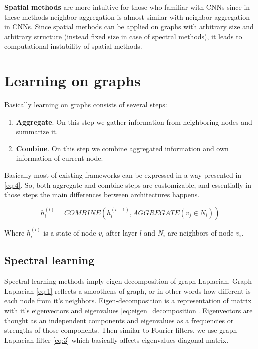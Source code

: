 \textbf{Spatial methods} are more intuitive for those who familiar with CNNs since in these methods neighbor aggregation is almost similar with neighbor aggregation in CNNs. Since spatial methods can be applied on graphs with arbitrary size and arbitrary structure (instead fixed size in case of spectral methods), it leads to computational instability of spatial methods.

\chapter{Learning on graphs}

Basically learning on graphs consists of several steps:

\begin{enumerate}
    \item \textbf{Aggregate}. On this step we gather information from neighboring nodes and summarize it.
    \item \textbf{Combine}. On this step we combine aggregated information and own information of current node.
\end{enumerate}

Basically most of existing frameworks can be expressed in a way presented in \ref{eq:4}. So, both aggregate and combine steps are customizable, and essentially in those steps the main differences between architectures happens.

\begin{equation}
    \label{eq:4}
    h_i^{(l)}=COMBINE(h_i^{(l-1)}, AGGREGATE(v_j\in N_i))
\end{equation}

Where $h_i^{(l)}$ is a state of node $v_i$ after layer $l$ and $N_i$ are neighbors of node $v_i$.

\section{Spectral learning}

Spectral learning methods imply eigen-decomposition of graph Laplacian. Graph Laplacian \ref{eq:1} reflects a smoothens of graph, or in other words how different is each node from it's neighbors. Eigen-decomposition is a representation of matrix with it's eigenvectors and eigenvalues \ref{eq:eigen_decomposition}. Eigenvectors are thought as an independent components and eigenvalues as a frequencies or strengths of those components. Then similar to Fourier filters, we use graph Laplacian filter \ref{eq:3} which basically affects eigenvalues diagonal matrix.

